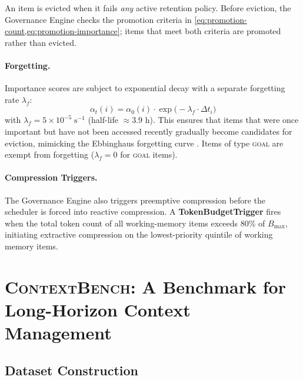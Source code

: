 \documentclass[review,12pt]{elsarticle}
\newcommand{\contextbench}{\textsc{ContextBench}}
\begin{document}
An item is evicted when it fails \emph{any} active retention policy.  Before
eviction, the Governance Engine checks the promotion criteria in
\cref{eq:promotion-count,eq:promotion-importance}; items that meet both criteria
are promoted rather than evicted.

\paragraph{Forgetting.}
Importance scores are subject to exponential decay with a separate forgetting
rate $\lambda_f$:
\begin{equation}
  \alpha_t(i) = \alpha_0(i) \cdot \exp\!\bigl(-\lambda_f \cdot \Delta t_i\bigr)
  \label{eq:forgetting}
\end{equation}
with $\lambda_f = 5 \times 10^{-5}\;\text{s}^{-1}$ (half-life $\approx 3.9$ h).
This ensures that items that were once important but have not been accessed
recently gradually become candidates for eviction, mimicking the Ebbinghaus
forgetting curve \citep{ebbinghaus1885memory}.  Items of type \textsc{goal} are
exempt from forgetting ($\lambda_f = 0$ for \textsc{goal} items).

\paragraph{Compression Triggers.}
The Governance Engine also triggers preemptive compression before the scheduler
is forced into reactive compression.  A \textbf{TokenBudgetTrigger} fires when
the total token count of all working-memory items exceeds 80\% of $B_{\max}$,
initiating extractive compression on the lowest-priority quintile of working
memory items.

\section{\contextbench{}: A Benchmark for Long-Horizon Context Management}
\label{sec:benchmark}

\subsection{Dataset Construction}
\label{subsec:dataset-construction}
\end{document}
